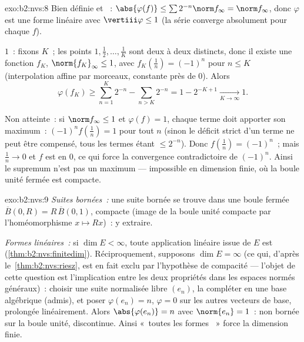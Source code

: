 \begin{solution}{exo:b2:nvs:8}
Bien définie et ~: $\abs{\varphi(f)} \leq \sum 2^{-n}
\norm f_\infty = \norm f_\infty$, donc $\varphi$ est une forme linéaire
avec $\vertiii\varphi \leq 1$ (la série converge absolument pour
chaque $f$).

 $1$~: fixons $K$~; les points $1, \frac12, \dots, \frac1K$ sont
deux à deux distincts, donc il existe une fonction  $f_K$, $\norm{f_K}_\infty
\leq 1$, avec $f_K(\frac1n) = (-1)^n$ pour $n \leq K$ (interpolation
affine par morceaux, constante près de $0$). Alors
\[
\varphi(f_K) \geq \sum_{n=1}^{K} 2^{-n} - \sum_{n > K} 2^{-n}
= 1 - 2^{-K+1} \xrightarrow[K \to \infty]{} 1 .
\]

Non atteinte~: si $\norm f_\infty \leq 1$ et $\varphi(f) = 1$, chaque
terme doit apporter son maximum~: $(-1)^n f(\frac1n) = 1$ pour tout
$n$ (sinon le déficit strict d'un terme ne peut être compensé,
tous les termes étant $\leq 2^{-n}$). Donc $f(\frac1n) = (-1)^n$~; mais
$\frac1n \to 0$ et $f$ est  en $0$, ce qui force la
convergence contradictoire de $(-1)^n$. Ainsi le supremum n'est pas un
maximum --- impossible en dimension finie, où la boule unité fermée
est compacte.
\end{solution}

\begin{solution}{exo:b2:nvs:9}
\emph{Suites bornées~:} une suite bornée se trouve dans une boule
fermée $\overline B(0, R) = R\,\overline B(0,1)$, compacte (image de
la boule unité compacte par l'homéomorphisme $x \mapsto Rx$)~:
y extraire.

\emph{Formes linéaires~:} si $\dim E < \infty$, toute application linéaire
issue de $E$ est  (\cref{thm:b2:nvs:finitedim}). Réciproquement,
supposons $\dim E = \infty$ (ce qui, d'après le~\cref{thm:b2:nvs:riesz},
est en fait exclu par l'hypothèse de compacité --- l'objet de
cette question est l'implication entre les deux propriétés dans les
espaces normés généraux)~: choisir une suite normalisée libre $(e_n)$,
la compléter en une base algébrique (admis), et poser $\varphi(e_n) = n$,
$\varphi = 0$ sur les autres vecteurs de base, prolongée linéairement.
Alors $\abs{\varphi(e_n)} = n$ avec $\norm{e_n} = 1$~: non bornée sur la
boule unité, discontinue. Ainsi «~toutes les formes ~» force la
dimension finie.
\end{solution}

